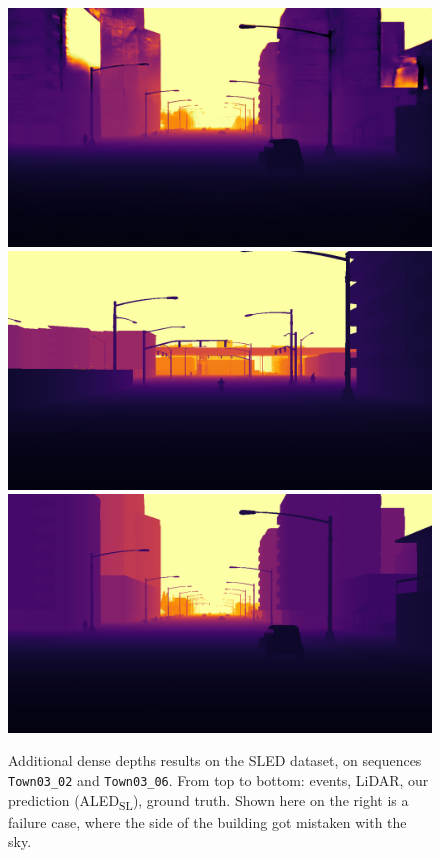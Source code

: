 \begin{figure}
  \includegraphics[width=0.475\linewidth]{mainmatter/figures/b_depth_conv/sled_dense_cmp_additional/prev005150.png}
  \includegraphics[width=0.475\linewidth]{mainmatter/figures/b_depth_conv/sled_dense_cmp_additional/gtprev004386.png}
  \includegraphics[width=0.475\linewidth]{mainmatter/figures/b_depth_conv/sled_dense_cmp_additional/gtprev005150.png}
  \cprotect\caption{Additional dense depths results on the SLED dataset, on sequences \verb|Town03_02| and \verb|Town03_06|. From top to bottom: events, LiDAR, our prediction (ALED\textsubscript{SL}), ground truth. Shown here on the right is a failure case, where the side of the building got mistaken with the sky.}\label{fig:appendix:aled:sled_cmp_additional_good_bad}
\end{figure}

